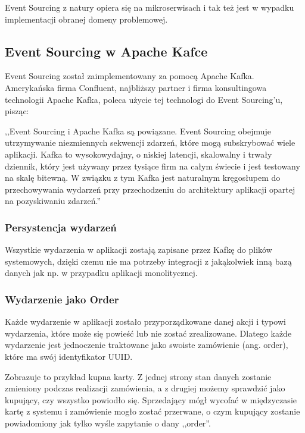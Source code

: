 Event Sourcing z natury opiera się na mikroserwisach i tak też jest w wypadku implementacji obranej domeny problemowej.

\subsection{Event Sourcing w Apache Kafce}
Event Sourcing został zaimplementowany za pomocą Apache Kafka.
Amerykańska firma Confluent, najbliższy partner i firma konsultingowa technologii Apache Kafka, poleca użycie tej technologi do Event Sourcing'u, pisząc:

,,Event Sourcing i Apache Kafka są powiązane. Event Sourcing obejmuje utrzymywanie niezmiennych sekwencji zdarzeń, które mogą subskrybować wiele aplikacji. Kafka to wysokowydajny, o niskiej latencji, skalowalny i trwały dziennik, który jest używany przez tysiące firm na całym świecie i jest testowany na skalę bitewną. W związku z tym Kafka jest naturalnym kręgosłupem do przechowywania wydarzeń przy przechodzeniu do architektury aplikacji opartej na pozyskiwaniu zdarzeń.'' \cite{Confluent}

\subsubsection{Persystencja wydarzeń}
Wszystkie wydarzenia w aplikacji zostają zapisane przez Kafkę do plików systemowych, dzięki czemu nie ma potrzeby integracji z jakąkolwiek inną bazą danych jak np. w przypadku aplikacji monolitycznej.

\subsubsection{Wydarzenie jako Order}
Każde wydarzenie w aplikacji zostało przyporządkowane danej akcji i typowi wydarzenia, które może się powieść lub nie zostać zrealizowane. Dlatego każde wydarzenie jest jednoczenie traktowane jako swoiste zamówienie (ang. order), które ma swój identyfikator UUID. 

Zobrazuje to przykład kupna karty. Z jednej strony stan danych zostanie zmieniony podczas realizacji zamówienia, a z drugiej możemy sprawdzić jako kupujący, czy wszystko powiodło się. Sprzedający mógł wycofać w międzyczasie kartę z systemu i zamówienie mogło zostać przerwane, o czym kupujący zostanie powiadomiony jak tylko wyśle zapytanie o dany ,,order''.

